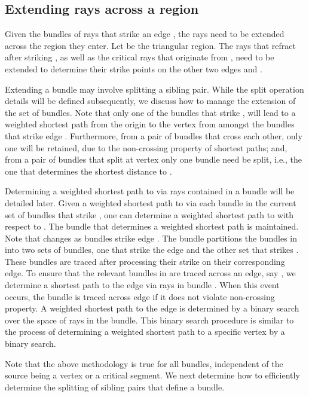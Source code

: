 \documentclass[11pt]{article}
\begin{document}
\subsection{Extending rays  across a region}
\label{subsect:extendrays}

 Given the bundles of rays that strike an edge , the rays need to be extended across the region they enter.
 Let  be the triangular region. The rays that refract after striking , as well as the critical rays that 
 originate from , need to be extended to determine their strike points on the other two edges  and .
 
 Extending a bundle may involve splitting a sibling pair. 
 While the split operation details will be defined subsequently,
 we discuss how to manage the extension of the set of bundles. 
 Note that only one of the bundles that strike , 
 will lead to a weighted shortest path from the origin  to the vertex  from amongst the bundles that strike edge . 
Furthermore, from a pair of bundles that cross each other, only one will be retained, due to the non-crossing property of shortest paths; and, from a  pair of bundles that split at vertex  only one bundle need be split, i.e., the one that determines the shortest distance to .

 Determining a weighted shortest path to  via rays contained in a bundle  will be detailed later. 
 Given a weighted shortest path to  via each bundle in the current set of bundles  that strike , one can determine a weighted shortest path to  with respect to . The bundle  that determines
 a weighted shortest path is maintained. Note that  changes as bundles strike edge .
 The bundle  partitions the bundles in  into two sets of bundles, one that strike
the edge   and the other set that strikes  . 
 These bundles are traced after processing their strike on their corresponding edge.
 To ensure that the relevant bundles in  are traced across an edge, say , we determine a shortest path to the edge  via rays in bundle .
 When this event occurs, the bundle is traced across edge  if it does not violate non-crossing property. 
 A weighted shortest path to the edge is determined by a binary search over the space of rays in the bundle. 
This binary search procedure is similar to the process of determining a weighted shortest path to a specific vertex by a binary search.


Note that the above  methodology is true for all bundles, independent of the source being a vertex or a critical segment.
We next determine how to efficiently determine the splitting of sibling pairs that define a bundle.
\end{document}
